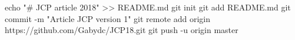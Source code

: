 echo "# JCP article 2018" >> README.md
git init
git add README.md
git commit -m "Article JCP  version 1"
git remote add origin https://github.com/Gabydc/JCP18.git
git push -u origin master
